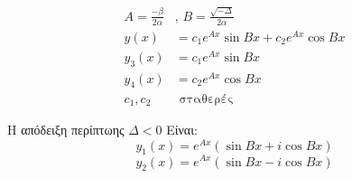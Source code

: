 \documentclass[]{book}
\begin{document}
\begin{multicols*}{2}
\begin{enumerate}
\begin{equation*}
\begin{aligned}
                    A        = \frac{-β}{2α} & \text{, } B = \frac{\sqrt{-Δ}}{2α}          \\
                    y(x)                     & = c_1 e^{Ax} \sin{Bx} + c_2 e^{Ax} \cos{Bx} \\
                    y_3(x)                   & = c_1 e^{Ax} \sin{Bx}                       \\
                    y_4(x)                   & = c_2 e^{Ax} \cos{Bx}                       \\
                    c_1, c_2                 & \text{ σταθερές}
                \end{aligned}
            \end{equation*}
\end{enumerate}
Η απόδειξη περίπτωης \(Δ<0\)
Είναι:
\begin{equation}\label{eqn:1}
    y_1(x) = e^{Ax} (\sin{Bx} + i \cos{Bx})
\end{equation}
\begin{equation}\label{eqn:2}
    y_2(x) = e^{Ax} (\sin{Bx} - i \cos{Bx})
\end{equation}


\end{multicols*}
\end{document}
